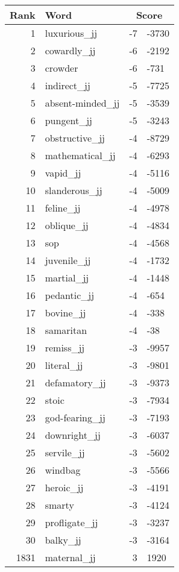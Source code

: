 \begin{longtable}[!htbp]{| rlr@{.}l |}
    \hline
    \textbf{Rank} & \textbf{Word} & \multicolumn{2}{c|}{\textbf{Score}} \\
    \hline
    \endhead
    1 & luxurious\_jj & -7 & -3730 \\
    2 & cowardly\_jj & -6 & -2192 \\
    3 & crowder & -6 & -731 \\
    4 & indirect\_jj & -5 & -7725 \\
    5 & absent-minded\_jj & -5 & -3539 \\
    6 & pungent\_jj & -5 & -3243 \\
    7 & obstructive\_jj & -4 & -8729 \\
    8 & mathematical\_jj & -4 & -6293 \\
    9 & vapid\_jj & -4 & -5116 \\
    10 & slanderous\_jj & -4 & -5009 \\
    11 & feline\_jj & -4 & -4978 \\
    12 & oblique\_jj & -4 & -4834 \\
    13 & sop & -4 & -4568 \\
    14 & juvenile\_jj & -4 & -1732 \\
    15 & martial\_jj & -4 & -1448 \\
    16 & pedantic\_jj & -4 & -654 \\
    17 & bovine\_jj & -4 & -338 \\
    18 & samaritan & -4 & -38 \\
    19 & remiss\_jj & -3 & -9957 \\
    20 & literal\_jj & -3 & -9801 \\
    21 & defamatory\_jj & -3 & -9373 \\
    22 & stoic & -3 & -7934 \\
    23 & god-fearing\_jj & -3 & -7193 \\
    24 & downright\_jj & -3 & -6037 \\
    25 & servile\_jj & -3 & -5602 \\
    26 & windbag & -3 & -5566 \\
    27 & heroic\_jj & -3 & -4191 \\
    28 & smarty & -3 & -4124 \\
    29 & profligate\_jj & -3 & -3237 \\
    30 & balky\_jj & -3 & -3164 \\
    1831 & maternal\_jj & 3 & 1920 \\

\end{longtable}
